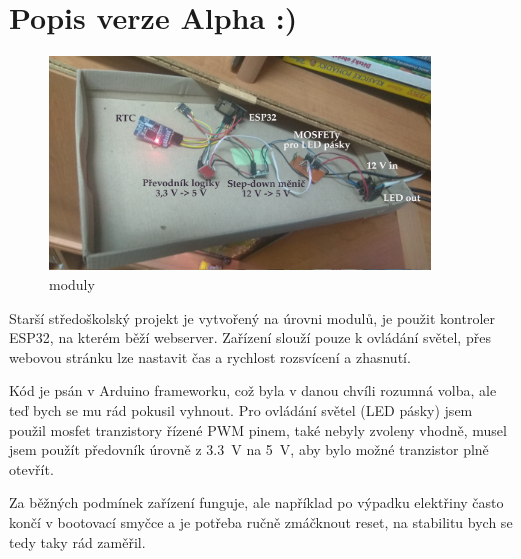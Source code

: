 \documentclass{customarticle}
\begin{document}
\clearpage
\section*{Popis verze Alpha :)}
	\begin{figure}[!h]
		\centering
		\includegraphics[width=0.9\textwidth]{moduly.jpg}
		\caption{moduly}
		\label{fig:moduly}
	\end{figure}
	Starší středoškolský projekt je vytvořený na úrovni modulů, je použit kontroler ESP32, na kterém běží webserver. Zařízení slouží pouze k ovládání světel, přes webovou stránku lze nastavit čas a rychlost rozsvícení a zhasnutí. 
	
	Kód je psán v Arduino frameworku, což byla v danou chvíli rozumná volba, ale teď bych se mu rád pokusil vyhnout. 
	Pro ovládání světel (LED pásky) jsem použil mosfet tranzistory řízené PWM pinem, také nebyly zvoleny vhodně, musel jsem použít předovník úrovně z \qty{3.3}{\volt} na \qty{5}{\volt}, aby bylo možné tranzistor plně otevřít.

	Za běžných podmínek zařízení funguje, ale například po výpadku elektřiny často končí v bootovací smyčce a je potřeba ručně zmáčknout reset, na stabilitu bych se tedy taky rád zaměřil.
\end{document}

